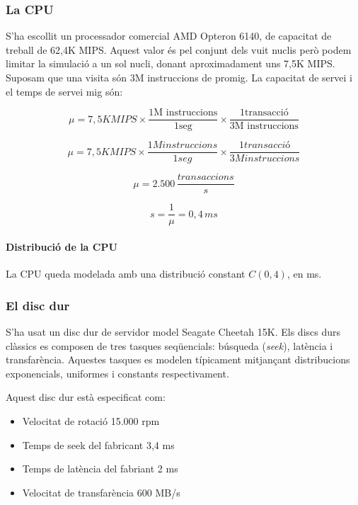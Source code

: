 \subsubsection{La CPU}

S'ha escollit un processador comercial AMD Opteron 6140, de capacitat de
treball de 62,4K MIPS\cite{cpu_specs}. Aquest valor és pel conjunt dels vuit
nuclis però podem limitar la simulació a un sol nucli, donant aproximadament
uns 7,5K MIPS. Suposam que una visita són 3M instruccions de promig. La
capacitat de servei i el temps de servei mig són:

\[ \mu = 7,5K MIPS \times \frac{1\text{M instruccions}}{1 \text{seg}} 
                \times \frac{1 \text{transacció}}{3 \text{M instruccions}} \]

\[ \mu = 7,5K MIPS \times \frac{1{M instruccions}}{1 {seg}} 
                \times \frac{1 {transacció}}{3 {M instruccions}} \]

\[ \mu = 2.500 \, \frac{transaccions}{s}\]

\[ s = \frac{1}{\mu} = 0,4 \, ms \]

\paragraph{Distribució de la CPU}

La CPU queda modelada amb una distribució constant $C(0,4)$, en ms.

\subsubsection{El disc dur}

S'ha usat un disc dur de servidor model Seagate Cheetah
15K\cite{disc_specs}. Els discs durs clàssics es composen de tres tasques
seqüencials: búsqueda (\emph{seek}), latència i transfarència. Aquestes tasques
es modelen típicament mitjançant distribucions exponencials, uniformes i
constants respectivament.

Aquest disc dur està especificat com:

\begin{itemize}

  \item Velocitat de rotació 15.000 rpm

  \item Temps de seek del fabricant 3,4 ms

  \item Temps de latència del fabriant 2 ms

  \item Velocitat de transfarència 600 MB/s

\end{itemize}

